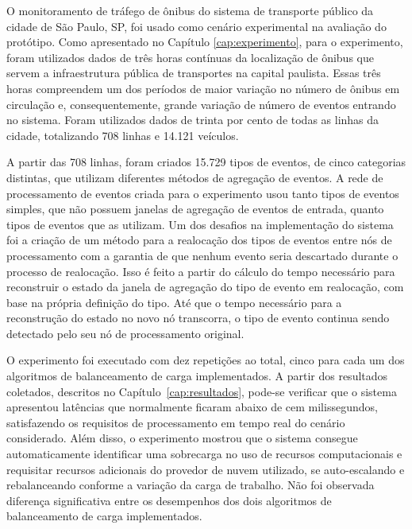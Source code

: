 O monitoramento de tráfego de ônibus do sistema de transporte
público da cidade de São Paulo, SP, foi usado como cenário experimental na avaliação do protótipo. Como apresentado no Capítulo \ref{cap:experimento}, para o experimento, foram utilizados dados de três horas contínuas da localização de ônibus que servem a infraestrutura pública de transportes na capital paulista. Essas três horas compreendem um dos períodos de maior variação no número de ônibus em circulação e, consequentemente, grande variação de número de eventos entrando no sistema. Foram utilizados dados de trinta por cento de todas as linhas da cidade, totalizando 708 linhas e 14.121 veículos. %

A partir das 708 linhas, foram criados 15.729 tipos de eventos, de cinco categorias distintas, que utilizam diferentes métodos de agregação de eventos. A rede de processamento de eventos criada para o experimento usou tanto tipos de eventos simples, que não possuem janelas de agregação de eventos de entrada, quanto tipos de eventos que as utilizam. Um dos desafios na implementação do sistema foi a criação de um método para a realocação dos tipos de eventos entre nós de processamento com a garantia de que nenhum evento seria descartado durante o processo de realocação. Isso é feito a partir do cálculo do tempo necessário para reconstruir o estado da janela de agregação do tipo de evento em realocação, com base na própria definição do tipo. Até que o tempo necessário para a reconstrução do estado no novo nó transcorra, o tipo de evento continua sendo detectado pelo seu nó de processamento original.

O experimento foi executado com dez repetições ao total, cinco para cada um dos algoritmos de balanceamento de carga implementados. A partir dos resultados coletados, descritos no Capítulo~\ref{cap:resultados}, pode-se verificar que o sistema apresentou latências que normalmente ficaram abaixo de cem milissegundos,  satisfazendo os requisitos de processamento em tempo real do cenário considerado. Além disso, o experimento mostrou que o sistema consegue automaticamente identificar uma sobrecarga no uso de recursos computacionais e requisitar recursos adicionais do provedor de nuvem utilizado, se auto-escalando e rebalanceando conforme a variação da carga de trabalho. Não foi observada diferença significativa entre os desempenhos dos dois algoritmos de balanceamento de carga implementados.


